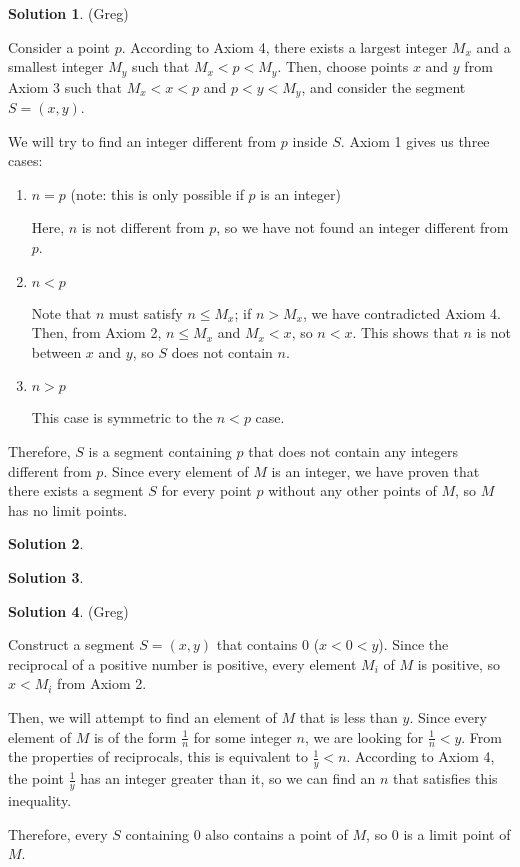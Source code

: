 \documentclass{article}
\theoremstyle{definition}
\newtheorem{solution}{Solution}
\begin{document}
\begin{solution} %
(Greg)

Consider a point $p$.
According to Axiom 4, there exists a largest integer $M_x$ and a smallest integer $M_y$ such that $M_x < p < M_y$.
Then, choose points $x$ and $y$ from Axiom 3 such that $M_x < x < p$ and $p < y < M_y$, and consider the segment $S = (x, y)$.

We will try to find an integer different from $p$ inside $S$.
Axiom 1 gives us three cases:

\begin{enumerate}
\item $n = p$ (note: this is only possible if $p$ is an integer)

Here, $n$ is not different from $p$, so we have not found an integer different from $p$.

\item $n < p$

Note that $n$ must satisfy $n \leq M_x$; if $n > M_x$, we have contradicted Axiom 4.
Then, from Axiom 2, $n \leq M_x$ and $M_x < x$, so $n < x$.
This shows that $n$ is not between $x$ and $y$, so $S$ does not contain $n$.

\item $n > p$

This case is symmetric to the $n < p$ case.

\end{enumerate}

Therefore, $S$ is a segment containing $p$ that does not contain any integers different from $p$.
Since every element of $M$ is an integer, we have proven that there exists a segment $S$ for every point $p$ without any other points of $M$, so $M$ has no limit points.

\end{solution}

\begin{solution} %
\end{solution}

\begin{solution} %
\end{solution}

\begin{solution} %
(Greg)

Construct a segment $S = (x, y)$ that contains $0$ ($x < 0 < y$).
Since the reciprocal of a positive number is positive, every element $M_i$ of $M$ is positive, so $x < M_i$ from Axiom 2.

Then, we will attempt to find an element of $M$ that is less than $y$.
Since every element of $M$ is of the form $\frac{1}{n}$ for some integer $n$, we are looking for $\frac{1}{n} < y$.
From the properties of reciprocals, this is equivalent to $\frac{1}{y} < n$.
According to Axiom 4, the point $\frac{1}{y}$ has an integer greater than it, so we can find an $n$ that satisfies this inequality.

Therefore, every $S$ containing $0$ also contains a point of $M$, so $0$ is a limit point of $M$.
\end{solution}
\end{document}
